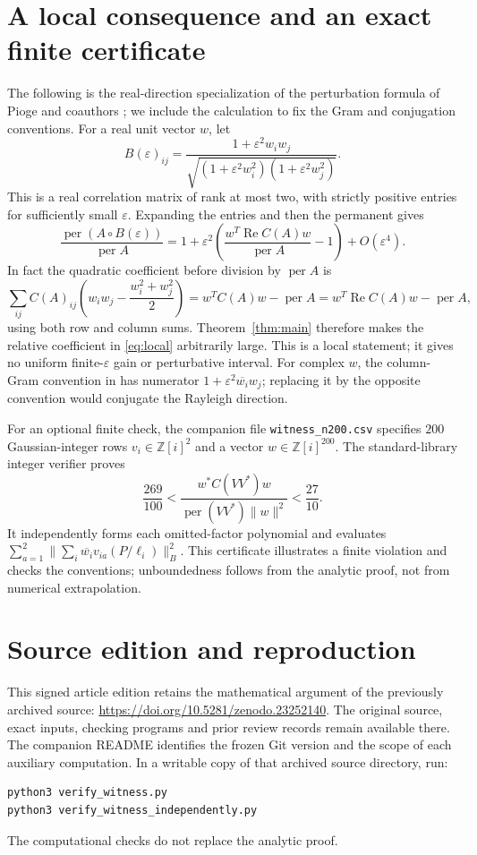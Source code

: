 \documentclass[11pt]{article}
\DeclareMathOperator{\per}{per}
\DeclareMathOperator{\Ree}{Re}
\begin{document}
\section{A local consequence and an exact finite certificate}
The following is the real-direction specialization of the perturbation formula
of Pioge and coauthors \cite[Lemma~1]{pioge}; we include the calculation to fix
the Gram and conjugation conventions. For a real unit vector $w$, let
\[
 B(\varepsilon)_{ij}=
 \frac{1+\varepsilon^2w_iw_j}
 {\sqrt{(1+\varepsilon^2w_i^2)(1+\varepsilon^2w_j^2)}}.
\]
This is a real correlation matrix of rank at most two, with strictly positive
entries for sufficiently small $\varepsilon$. Expanding the entries and then
the permanent gives
\begin{equation}\label{eq:local}
 \frac{\per(A\circ B(\varepsilon))}{\per A}
 =1+\varepsilon^2\left(\frac{w^T\Ree C(A)w}{\per A}-1\right)
       +O(\varepsilon^4).
\end{equation}
In fact the quadratic coefficient before division by $\per A$ is
\[
 \sum_{ij}C(A)_{ij}\left(w_iw_j-\frac{w_i^2+w_j^2}{2}\right)
 =w^TC(A)w-\per A=w^T\Ree C(A)w-\per A,
\]
using both row and column sums. Theorem~\ref{thm:main} therefore makes the
relative coefficient in \eqref{eq:local} arbitrarily large. This is a local
statement; it gives no uniform finite-$\varepsilon$ gain or perturbative interval.
For complex $w$, the column-Gram convention in \cite{pioge} has numerator
$1+\varepsilon^2\overline{w_i}w_j$; replacing it by the opposite convention
would conjugate the Rayleigh direction.

For an optional finite check, the companion file \texttt{witness\_n200.csv}
specifies $200$ Gaussian-integer rows $v_i\in\mathbb Z[i]^2$ and a vector
$w\in\mathbb Z[i]^{200}$. The standard-library integer verifier proves
\[
 \frac{269}{100}<\frac{w^*C(VV^*)w}{\per(VV^*)\|w\|^2}<\frac{27}{10}.
\]
It independently forms each omitted-factor polynomial and evaluates
$\sum_{a=1}^2\|\sum_i\overline{w_i}v_{ia}(P/\ell_i)\|_B^2$.
This certificate illustrates a finite violation and checks the conventions;
unboundedness follows from the analytic proof, not from numerical extrapolation.


\section*{Source edition and reproduction}
This signed article edition retains the mathematical argument of the
previously archived source: \url{https://doi.org/10.5281/zenodo.23252140}.
The original source, exact inputs, checking programs and prior review
records remain available there. The companion README identifies the
frozen Git version and the scope of each auxiliary computation.
In a writable copy of that archived source directory, run:
\begin{verbatim}
python3 verify_witness.py
python3 verify_witness_independently.py
\end{verbatim}
The computational checks do not replace the analytic proof.
\end{document}
